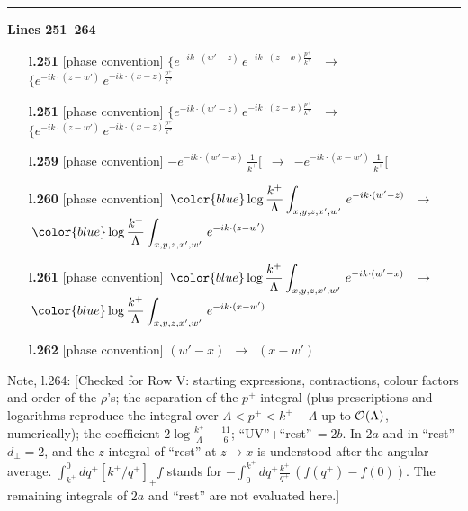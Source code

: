 \documentclass[10pt]{article}
\newenvironment{notebox}{\def\FrameCommand{{\color{notebar}\vrule width 1.5pt}\hspace{6pt}}\MakeFramed{\advance\hsize-\width\FrameRestore}\small}{\endMakeFramed}
\begin{document}
\noindent\rule{\linewidth}{0.3pt}\par\noindent\textbf{Lines 251--264} \par
\begin{itemize}[leftmargin=2.2em,itemsep=1pt,topsep=2pt]
\item[\textbf{l.251}] \textsf{\small [phase convention]} $\displaystyle \{e^{-ik\cdot(w'-z)}\,e^{-ik\cdot(z-x)\frac{p^{+}}{k^{+}}}\,$\ $\longrightarrow$\ $\displaystyle \{e^{-ik\cdot(z-w')}\,e^{-ik\cdot(x-z)\frac{p^{+}}{k^{+}}}\,$
\item[\textbf{l.251}] \textsf{\small [phase convention]} $\displaystyle \{e^{-ik\cdot(w'-z)}\,e^{-ik\cdot(z-x)\frac{p^{+}}{k^{+}}}\,$\ $\longrightarrow$\ $\displaystyle \{e^{-ik\cdot(z-w')}\,e^{-ik\cdot(x-z)\frac{p^{+}}{k^{+}}}\,$
\item[\textbf{l.259}] \textsf{\small [phase convention]} $\displaystyle -e^{-ik\cdot(w'-x)}\,\frac{1}{k^{+}}[$\ $\longrightarrow$\ $\displaystyle -e^{-ik\cdot(x-w')}\,\frac{1}{k^{+}}[$
\item[\textbf{l.260}] \textsf{\small [phase convention]} $\displaystyle \,{\color{blue}\log\frac{k^{+}}{\Lambda}}\int_{x,y,z,x',w'}\,e^{-ik\cdot(w'-z)}\,$\ $\longrightarrow$\ $\displaystyle \,{\color{blue}\log\frac{k^{+}}{\Lambda}}\int_{x,y,z,x',w'}\,e^{-ik\cdot(z-w')}\,$
\item[\textbf{l.261}] \textsf{\small [phase convention]} $\displaystyle \,{\color{blue}\log\frac{k^{+}}{\Lambda}}\int_{x,y,z,x',w'}\,e^{-ik\cdot(w'-x)}\,$\ $\longrightarrow$\ $\displaystyle \,{\color{blue}\log\frac{k^{+}}{\Lambda}}\int_{x,y,z,x',w'}\,e^{-ik\cdot(x-w')}\,$
\item[\textbf{l.262}] \textsf{\small [phase convention]} $\displaystyle (w'-x)$\ $\longrightarrow$\ $\displaystyle (x-w')$
\end{itemize}
\begin{notebox}\textsf{\small Note, l.264:} [Checked for Row V: starting expressions, contractions, colour factors and order of the $\rho$'s; the separation of the $p^{+}$ integral (plus prescriptions and logarithms reproduce the integral over $\Lambda<p^{+}<k^{+}-\Lambda$ up to ${\cal O}(\Lambda)$, numerically); the coefficient $2\log\frac{k^{+}}{\Lambda}-\frac{11}{6}$; ``UV''+``rest''$\,=2b$. In $2a$ and in ``rest'' $d_{\perp}=2$, and the $z$ integral of ``rest'' at $z\to x$ is understood after the angular average. $\int^{0}_{k^{+}}dq^{+}[k^{+}/q^{+}]_{+}f$ stands for $-\int_{0}^{k^{+}}dq^{+}\frac{k^{+}}{q^{+}}\,(f(q^{+})-f(0))$. The remaining integrals of $2a$ and ``rest'' are not evaluated here.]\end{notebox}
\bigskip
\end{document}
